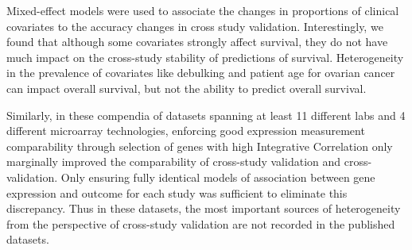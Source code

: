 \documentclass{bioinfo}
\begin{document}
Mixed-effect models were used to associate the changes 
in proportions of clinical covariates to the accuracy
changes in cross study validation. %
Interestingly, we found that although some covariates strongly affect survival, 
they do not have much impact on the cross-study stability of
predictions of survival.  Heterogeneity in the prevalence 
of covariates like debulking and patient age for ovarian cancer can impact 
overall survival, but not the ability to predict overall survival.

Similarly, in these compendia of datasets spanning at least 11 different labs
and 4 different microarray technologies, enforcing good
expression measurement comparability through selection of genes with
high Integrative Correlation \citep{Parmigiani2004, Garrett-Mayer2008} only marginally improved
the comparability of cross-study validation and cross-validation. Only
ensuring fully identical models of association between gene expression
and outcome for each study was sufficient to eliminate this
discrepancy. %
Thus in these datasets, the most
important sources of heterogeneity from the perspective of cross-study
validation are not recorded in the published datasets.
\end{document}
